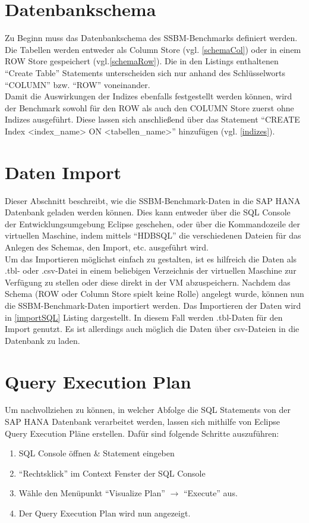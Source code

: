 \section{Datenbankschema}
Zu Beginn muss das Datenbankschema des SSBM-Benchmarks definiert werden. Die Tabellen werden entweder als Column Store (vgl. \autoref{schemaCol})  oder in einem ROW Store gespeichert (vgl.\autoref{schemaRow}). Die in den Listings enthaltenen \enquote{Create Table} Statements unterscheiden sich nur anhand des Schlüsselworts \enquote{COLUMN} bzw. \enquote{ROW} voneinander. 
\\Damit die Auswirkungen der Indizes ebenfalls festgestellt werden können, wird der Benchmark sowohl für den ROW als auch den COLUMN Store zuerst ohne Indizes ausgeführt. Diese lassen sich anschließend über das Statement \enquote{CREATE Index <index\_name> ON <tabellen\_name>} hinzufügen (vgl. \autoref{indizes}).

\section{Daten Import}
Dieser Abschnitt beschreibt, wie die SSBM-Benchmark-Daten in die SAP HANA Datenbank geladen werden können. Dies kann entweder über die SQL Console der Entwicklungsumgebung Eclipse geschehen, oder über die Kommandozeile der virtuellen Maschine, indem mittels \enquote{HDBSQL} die verschiedenen Dateien für das Anlegen des Schemas, den Import, etc. ausgeführt wird.
\\Um das Importieren möglichst einfach zu gestalten, ist es hilfreich die Daten als .tbl- oder .csv-Datei in einem beliebigen Verzeichnis der virtuellen Maschine zur Verfügung zu stellen oder diese direkt in der VM abzuspeichern.
Nachdem das Schema (ROW oder Column Store spielt keine Rolle) angelegt wurde, können nun die SSBM-Benchmark-Daten importiert werden. Das Importieren der Daten wird in \autoref{importSQL} Listing dargestellt. In diesem Fall werden .tbl-Daten für den Import genutzt. Es ist allerdings auch möglich die Daten über csv-Dateien in die Datenbank zu laden.


\section{Query Execution Plan}
Um nachvollziehen zu können, in welcher Abfolge die SQL Statements von der SAP HANA Datenbank verarbeitet werden, lassen sich mithilfe von Eclipse Query Execution Pläne erstellen.
Dafür sind folgende Schritte auszuführen:
\begin{enumerate}
	\item SQL Console öffnen \& Statement eingeben
	\item \enquote{Rechtsklick} im Context Fenster der SQL Console
	\item Wähle den Menüpunkt \enquote{Visualize Plan} $\rightarrow$ \enquote{Execute} aus.
	\item Der Query Execution Plan wird nun angezeigt.
\end{enumerate} 
